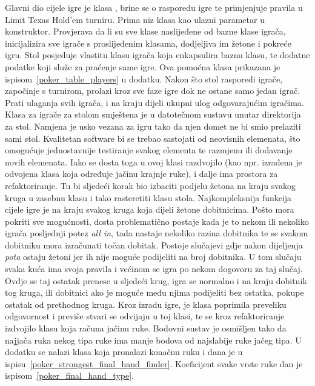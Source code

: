 Glavni dio cijele igre je klasa , brine se o rasporedu igre te primjenjuje pravila u Limit Texas Hold'em turniru. Prima niz klasa kao ulazni parametar u konstruktor. Provjerava da li su sve klase naslijeđene od bazne klase igrača, inicijalizira sve igrače s proslijeđenim klasama, dodjeljiva im žetone i pokreće igru. Stol posjeduje vlastitu klasu igrača koja enkapsulira baznu klasu, te dodatne podatke koji služe za praćenje same igre. Ova pomoćna klasa prikazana je ispisom~\ref{poker_table_players} u dodatku. Nakon što stol rasporedi igrače, započinje s turnirom, prolazi kroz sve faze igre dok ne ostane samo jedan igrač. Prati ulaganja svih igrača, i na kraju dijeli ukupni ulog odgovarajućim igračima. Klasa za igrače za stolom smještena je u datotečnom sustavu unutar direktorija za stol. Namjena je usko vezana za igru tako da njen domet ne bi smio prelaziti sami stol. Kvalitetan software bi se trebao sastojati od neovisnih elemenata, što omogućuje jednostavnije testiranje svakog elementa te razmjenu ili dodavanje novih elemenata. Iako se dosta toga u ovoj klasi razdvojilo (kao npr. izrađena je odvojena klasa koja određuje jačinu krajnje ruke), i dalje ima prostora za refaktoriranje. Tu bi sljedeći korak bio izbaciti podjelu žetona na kraju svakog kruga u zasebnu klasu i tako rasteretiti klasu stola. Najkompleksnija funkcija cijele igre je na kraju svakog kruga koja dijeli žetone dobitnicima. Pošto mora pokriti sve mogućnosti, dosta problematično postaje kada je to nekom ili nekoliko igrača posljednji potez \emph{all in}, tada nastaje nekoliko razina dobitnika te se svakom dobitniku mora izračunati točan dobitak. Postoje slučajevi gdje nakon dijeljenja \emph{pota} ostaju žetoni jer ih nije moguće podijeliti na broj dobitnika. U tom slučaju svaka kuća ima svoja pravila i većinom se igra po nekom dogovoru za taj slučaj. Ovdje se taj ostatak prenese u sljedeći krug, igra se normalno i na kraju dobitnik tog kruga, ili dobitnici ako je moguće među njima podijeliti bez ostatka, pokupe ostatak od prethodnog kruga. Kroz izradu igre, je klasa  poprimila preveliku odgovornost i previše stvari se odvijaju u toj klasi, te se kroz refaktoriranje izdvojilo klasu koja računa jačinu ruke. Bodovni sustav je osmišljen tako da najjača ruka nekog tipa ruke ima manje bodova od najslabije ruke jačeg tipa. U dodatku se nalazi klasa koja pronalazi konačnu ruku i dana je u ispisu~\ref{poker_strongest_final_hand_finder}. Koeficijent svake vrste ruke dan je ispisom~\ref{poker_final_hand_type}.


